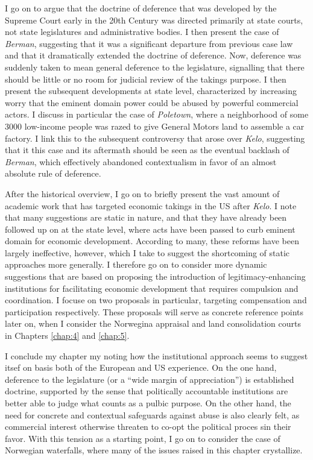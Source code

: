 \documentclass[12pt,a4paper]{article} %
\begin{document}
I go on to argue that the doctrine of deference that was developed by the Supreme Court early in the 20th Century was directed primarily at state courts, not state legislatures and administrative bodies. I then present the case of {\it Berman}, suggesting that it was a significant departure from previous case law and that it dramatically extended the doctrine of deference. Now, deference was suddenly taken to mean general deference to the legislature, signalling that there should be little or no room for judicial review of the takings purpose.  I then present the subsequent developments at state level, characterized by increasing worry that the eminent domain power could be abused by powerful commercial actors. I discuss in particular the case of {\it Poletown}, where a neighborhood of some 3000 low-income people was razed to give General Motors land to assemble a car factory. I link this to the subsequent controversy that arose over {\it Kelo}, suggesting that it this case and its aftermath should be seen as the eventual backlash of {\it Berman}, which effectively abandoned contextualism in favor of an almost absolute rule of deference.

After the historical overview, I go on to briefly present the vast amount of academic work that has targeted economic takings in the US after {\it Kelo}. I note that many suggestions are static in nature, and that they have already been followed up on at the state level, where acts have been passed to curb eminent domain for economic development. According to many, these reforms have been largely ineffective, however, which I take to suggest the shortcoming of static approaches more generally. I therefore go on to consider more dynamic suggestions that are based on proposing the introduction of legitimacy-enhancing institutions for facilitating  economic development that requires compulsion and coordination. I focuse on two proposals in particular, targeting compensation and participation respectively. These proposals will serve as concrete reference points later on, when I consider the Norwegina appraisal  and land consolidation courts in Chapters \ref{chap:4} and \ref{chap:5}.

I conclude my chapter my noting how the institutional approach seems to suggest itsef on basis both of the European and US experience. On the one hand, deference to the legislature (or a ``wide margin of appreciation'') is established doctrine, supported by the sense that politically accountable institutions are better able to judge what counts as a pulbic purpose. On the other hand, the need for concrete and contextual safeguards against abuse is also clearly felt, as commercial interest otherwise threaten to co-opt the political proces sin their favor. With this tension as a starting point, I go on to consider the case of Norwegian waterfalls, where many of the issues raised in this chapter crystallize.
\end{document}
